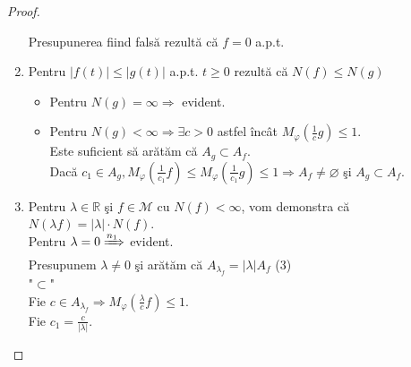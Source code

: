 \documentclass[ a4paper, 12pt]{report}
\theoremstyle{remark}
\numberwithin{equation}{section}
\begin{document}
\begin{proof}
\begin{enumerate}[($n_1$)]
Presupunerea fiind fals\u a  rezult\u a c\u a $f =0$ a.p.t.
\item Pentru $\lvert f(t) \rvert \leq \lvert g(t) \rvert$ a.p.t. $t \geq 0$ rezult\u a c\u a $N(f) \leq N(g)$\\
\begin{itemize}
\item Pentru $N(g) = \infty \Rightarrow$ evident.\\
\item Pentru  $N(g) < \infty \Rightarrow \exists c >0$ astfel \^inc\^at $M_\varphi (\frac{1}{c} g) \leq 1.$\\
Este suficient s\u a ar\u at\u am c\u a $A_g \subset A_f$.\\Dac\u a $c_1 \in A_g,  M_\varphi(\frac{1}{c_1}f) \leq M_\varphi(\frac{1}{c_1}g) \leq 1 \Rightarrow A_f \neq \varnothing$ \c si $A_g \subset A_f$.\\
\end{itemize}
\newpage
\item Pentru $\lambda \in \mathbb{R}$ \c si $f \in \mathcal{M}$ cu $N(f) < \infty$, vom demonstra c\u a $N(\lambda f) = \lvert \lambda \rvert\cdot N(f)$.\\
Pentru $\lambda = 0 \xRightarrow{n_1}$ evident.\\
Presupunem $\lambda \neq 0$ \c si ar\u at\u am c\u a $A_{\lambda_f} = \lvert \lambda \rvert A_f$\hspace{40mm} (3)\\
\vspace{3mm}"$\subset$"\\
Fie $c \in A_{\lambda_f} \Rightarrow M_\varphi\left (\frac{\lambda}{c}f \right ) \leq 1.$\\
Fie $c_1 = \frac{c}{\lvert \lambda \rvert}.$\\


\end{enumerate}
\end{proof}
\end{document}
